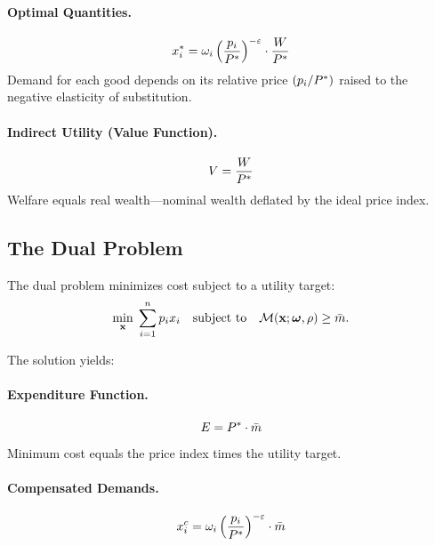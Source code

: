 \paragraph{Optimal Quantities.}
\begin{equation}
x_i^* = \omega_i \left( \frac{p_i}{P^{*}} \right)^{-\varepsilon} \cdot \frac{W}{P^{*}}
\end{equation}
Demand for each good depends on its relative price $(p_i/P^{*})$ raised to the negative elasticity of substitution.

\paragraph{Indirect Utility (Value Function).}
\begin{equation}
V = \frac{W}{P^{*}}
\end{equation}
Welfare equals real wealth---nominal wealth deflated by the ideal price index.

\subsection{The Dual Problem}
\label{subsec:summary-dual}

The dual problem minimizes cost subject to a utility target:
\begin{equation}
\min_{\mathbf{x}} \; \sum_{i=1}^{n} p_i x_i \quad \text{subject to} \quad \mathcal{M}(\mathbf{x}; \boldsymbol{\omega}, \rho) \geq \bar{m}.
\end{equation}

The solution yields:

\paragraph{Expenditure Function.}
\begin{equation}
E = P^{*} \cdot \bar{m}
\end{equation}
Minimum cost equals the price index times the utility target.

\paragraph{Compensated Demands.}
\begin{equation}
x_i^c = \omega_i \left( \frac{p_i}{P^{*}} \right)^{-\varepsilon} \cdot \bar{m}
\end{equation}

